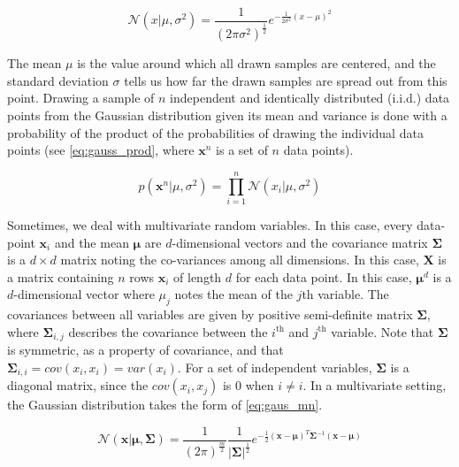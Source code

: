 \begin{equation}\label{eq:gauss}
    \mathcal{N}(x|\mu, \sigma^2)=\frac{1}{(2 \pi \sigma ^2)^{\frac{1}{2}}} e^{- \frac{1}{2\sigma ^2}(x - \mu)^2}
\end{equation}

The mean $\mu$ is the value around which all drawn samples are centered, and the standard deviation $\sigma$ tells us how far the drawn samples are spread out from this point. Drawing a sample of $n$ independent and identically distributed (i.i.d.) data points from the Gaussian distribution given its mean and variance is done with a probability of the product of the probabilities of drawing the individual data points (see \ref{eq:gauss_prod}, where $\textbf{x}^n$ is a set of $n$ data points).

\begin{equation}\label{eq:gauss_prod}
    p(\textbf{x}^n | \mu, \sigma^2) = \prod_{i=1}^{n}{\mathcal{N}(x_i|\mu, \sigma^2)}
\end{equation}

Sometimes, we deal with multivariate random variables. In this case, every data-point $\bm{x}_i$ and the mean $\bm{\mu}$ are $d$-dimensional vectors and the covariance matrix $\bm{\Sigma}$ is a $d \times d$ matrix noting the co-variances among all dimensions. In this case, $\textbf{X}$ is a matrix containing $n$ rows $\textbf{x}_i$ of length $d$ for each data point. In this case, $\bm{\mu}^d$ is a $d$-dimensional vector where $\mu_j$ notes the mean of the $j$th variable. The covariances between all variables are given by positive semi-definite matrix $\bm{\Sigma}$, where $\bm{\Sigma}_{i,j}$ describes the covariance between the $i^\text{th}$ and $j^\text{th}$ variable. Note that $\bm{\Sigma}$ is symmetric, as a property of covariance, and that $\bm{\Sigma}_{i,i}=cov(x_i,x_i) = var(x_i)$. For a set of independent variables, $\bm{\Sigma}$ is a diagonal matrix, since the $cov(x_i,x_j)$ is $0$ when $i\neq i$. In a multivariate setting, the Gaussian distribution takes the form of \ref{eq:gaus_mn}.

\begin{equation}\label{eq:gaus_mn}
    \mathcal{N}(\textbf{x}|\bm{\mu}, \bm{\Sigma})=\frac{1}{(2 \pi)^{\frac{m}{2}}}\frac{1}{|\bm{\Sigma}|^{\frac{1}{2}}} e^{- \frac{1}{2}(\textbf{x} - \bm{\mu})^T \bm{\Sigma}^{-1}(\textbf{x} - \bm{\mu})}
\end{equation}

